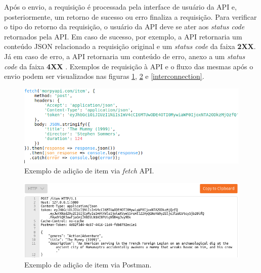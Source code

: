Após o envio, a requisição é processada pela interface de usuário da API e, posteriormente, um retorno de sucesso ou erro finaliza a requisição. Para verificar o tipo do retorno da requisição, o usuário da API deve se ater aos \textit{status code} retornados pela API. Em caso de sucesso, por exemplo, a API retornaria um conteúdo JSON relacionado a requisição original e um \textit{status code} da faixa \textbf{2XX}. Já em caso de erro, a API retornaria um conteúdo de erro, anexo a um \textit{status code} da faixa \textbf{4XX} \cite{fielding1999hypertext}. Exemplos de requisição à API e o fluxo das mesmas após o envio podem ser visualizados nas figuras \ref{fetch_api}, \ref{postman} e \ref{interconnection}.

\begin{figure}[htp]
	\caption{\label{fetch_api}Exemplo de adição de item via \textit{fetch} API.}
	\begin{center}
		\includegraphics[scale=0.8]{images/fetch_api.png}
	\end{center}
	\hspace{5.5cm}{Fonte: O Autor.}
\end{figure}

\begin{figure}[htp]
	\caption{\label{postman}Exemplo de adição de item via Postman.}
	\begin{center}
		\includegraphics[scale=0.85]{images/postman.png}
	\end{center}
	\hspace{5.5cm}{Fonte: O Autor.}
\end{figure}

